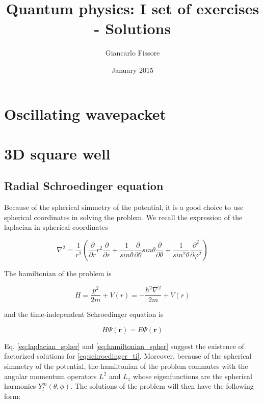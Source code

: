 \documentclass{article}
\begin{document}
\title{Quantum physics: I set of exercises - Solutions}
\author{Giancarlo Fissore}
\date{January 2015}
\maketitle

\section{Oscillating wavepacket}

\section{3D square well}

\subsection{Radial Schroedinger equation}
Because of the spherical simmetry of the potential, it is a good choice to use spherical coordinates in solving the problem. We recall the expression of the laplacian in spherical coordinates

\begin{equation}
\label{eq:laplacian_spher}
\nabla^2 = \frac{1}{r^2} \left( \frac{\partial}{\partial r} r^2 \frac{\partial}{\partial r} + \frac{1}{sin\theta} \frac{\partial}{\partial \theta} sin\theta \frac{\partial}{\partial \theta} + \frac{1}{sin^2\theta} \frac{\partial^2}{\partial \varphi^2} \right)
\end{equation}

The hamiltonian of the problem is

\begin{equation}
\label{eq:hamiltonian_spher}
H = \frac{p^2}{2m} + V(r) = -\frac{\hbar^2 \nabla^2}{2m} + V(r)
\end{equation}

and the time-independent Schroedinger equation is

\begin{equation}
\label{eq:schroedinger_ti}
H\Psi(\bm{r}) = E\Psi(\bm{r})
\end{equation}

Eq. \eqref{eq:laplacian_spher} and \eqref{eq:hamiltonian_spher} suggest the existence of factorized solutions for \eqref{eq:schroedinger_ti}. Moreover, because of the spherical simmetry of the potential, the hamiltonian of the problem commutes with the angular momentum operators \(L^2\) and \(L_{z}\) whose eigenfunctions are the spherical harmonics \(Y_{l}^m(\theta,\phi)\). The solutions of the problem will then have the following form:
\end{document}
